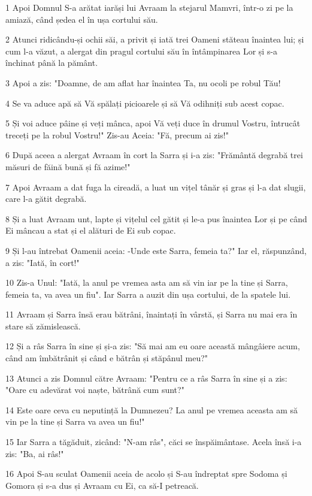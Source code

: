 \par 1 Apoi Domnul S-a arătat iarăși lui Avraam la stejarul Mamvri, într-o zi pe la amiază, când ședea el în ușa cortului său.
\par 2 Atunci ridicându-și ochii săi, a privit și iată trei Oameni stăteau înaintea lui; și cum l-a văzut, a alergat din pragul cortului său în întâmpinarea Lor și s-a închinat până la pământ.
\par 3 Apoi a zis: "Doamne, de am aflat har înaintea Ta, nu ocoli pe robul Tău!
\par 4 Se va aduce apă să Vă spălați picioarele și să Vă odihniți sub acest copac.
\par 5 Și voi aduce pâine și veți mânca, apoi Vă veți duce în drumul Vostru, întrucât treceți pe la robul Vostru!" Zis-au Aceia: "Fă, precum ai zis!"
\par 6 După aceea a alergat Avraam în cort la Sarra și i-a zis: "Frământă degrabă trei măsuri de făină bună și fă azime!"
\par 7 Apoi Avraam a dat fuga la cireadă, a luat un vițel tânăr și gras și l-a dat slugii, care l-a gătit degrabă.
\par 8 Și a luat Avraam unt, lapte și vițelul cel gătit și le-a pus înaintea Lor și pe când Ei mâncau a stat și el alături de Ei sub copac.
\par 9 Și l-au întrebat Oamenii aceia: -Unde este Sarra, femeia ta?" Iar el, răspunzând, a zis: "Iată, în cort!"
\par 10 Zis-a Unul: "Iată, la anul pe vremea asta am să vin iar pe la tine și Sarra, femeia ta, va avea un fiu". Iar Sarra a auzit din ușa cortului, de la spatele lui.
\par 11 Avraam și Sarra însă erau bătrâni, înaintați în vârstă, și Sarra nu mai era în stare să zămislească.
\par 12 Și a râs Sarra în sine și și-a zis: "Să mai am eu oare această mângâiere acum, când am îmbătrânit și când e bătrân și stăpânul meu?"
\par 13 Atunci a zis Domnul către Avraam: "Pentru ce a râs Sarra în sine și a zis: "Oare cu adevărat voi naște, bătrână cum sunt?"
\par 14 Este oare ceva cu neputință la Dumnezeu? La anul pe vremea aceasta am să vin pe la tine și Sarra va avea un fiu!"
\par 15 Iar Sarra a tăgăduit, zicând: "N-am râs", căci se înspăimântase. Acela însă i-a zis: "Ba, ai râs!"
\par 16 Apoi S-au sculat Oamenii aceia de acolo și S-au îndreptat spre Sodoma și Gomora și s-a dus și Avraam cu Ei, ca să-I petreacă.

